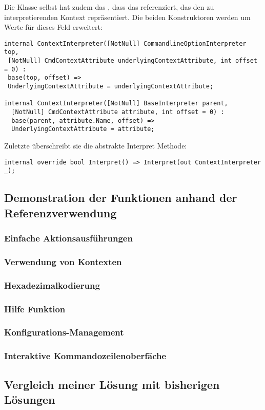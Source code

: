  Die  Klasse selbst hat zudem das , dass das  referenziert, das den zu interpretierenden Kontext repr\"asentiert.
 Die beiden Konstruktoren werden um Werte f\"ur dieses Feld erweitert:
 \begin{lstlisting}[language={[Sharp]C}, title=Konstruktoren der ContextInterpreter Klasse]
internal ContextInterpreter([NotNull] CommandlineOptionInterpreter top,
 [NotNull] CmdContextAttribute underlyingContextAttribute, int offset = 0) :
 base(top, offset) =>
 UnderlyingContextAttribute = underlyingContextAttribute;

internal ContextInterpreter([NotNull] BaseInterpreter parent,
  [NotNull] CmdContextAttribute attribute, int offset = 0) :
  base(parent, attribute.Name, offset) =>
  UnderlyingContextAttribute = attribute; \end{lstlisting}
 Zuletzte \"uberschreibt sie die abstrakte Interpret Methode:
 \begin{lstlisting}[title=\"Uberschreibung der Interpret Methode]
  internal override bool Interpret() => Interpret(out ContextInterpreter _);\end{lstlisting}
 \subsection{Demonstration der Funktionen anhand der Referenzverwendung}\label{subsec:demonstration}
 \subsubsection{Einfache Aktionsausführungen}
 \subsubsection{Verwendung von Kontexten}
 \subsubsection{Hexadezimalkodierung}\label{Hexadecimalencoding}
 \subsubsection{Hilfe Funktion}
 \subsubsection{Konfigurations-Management}\label{ConfigurationManagement}
 \subsubsection{Interaktive Kommandozeilenoberfäche}
 \subsection{Vergleich meiner Lösung mit bisherigen Lösungen}\label{subsec:Comparison}